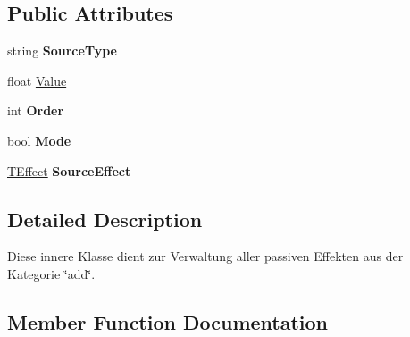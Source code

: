 \subsection*{Public Attributes}
\begin{DoxyCompactItemize}
\item 
\hypertarget{class_r_p_g_object_1_1_attribut_modification_helper_1_1_modification_a209f4406dff4c1139b883f437c838c97}{}string {\bfseries Source\+Type}\label{class_r_p_g_object_1_1_attribut_modification_helper_1_1_modification_a209f4406dff4c1139b883f437c838c97}

\item 
float \hyperlink{class_r_p_g_object_1_1_attribut_modification_helper_1_1_modification_ac47bbc3b20ca8250893a20e816feecd1}{Value}
\item 
\hypertarget{class_r_p_g_object_1_1_attribut_modification_helper_1_1_modification_a5cab54c13609d00e3a0963aecf29109b}{}int {\bfseries Order}\label{class_r_p_g_object_1_1_attribut_modification_helper_1_1_modification_a5cab54c13609d00e3a0963aecf29109b}

\item 
\hypertarget{class_r_p_g_object_1_1_attribut_modification_helper_1_1_modification_ad4e4f83e54f7b0fec528d815c2cfc847}{}bool {\bfseries Mode}\label{class_r_p_g_object_1_1_attribut_modification_helper_1_1_modification_ad4e4f83e54f7b0fec528d815c2cfc847}

\item 
\hypertarget{class_r_p_g_object_1_1_attribut_modification_helper_1_1_modification_a096613a99f591c94f53e96bc31c20f73}{}\hyperlink{class_t_effect}{T\+Effect} {\bfseries Source\+Effect}\label{class_r_p_g_object_1_1_attribut_modification_helper_1_1_modification_a096613a99f591c94f53e96bc31c20f73}

\end{DoxyCompactItemize}


\subsection{Detailed Description}
Diese innere Klasse dient zur Verwaltung aller passiven Effekten aus der Kategorie \char`\"{}add\char`\"{}. 

\subsection{Member Function Documentation}
\hypertarget{class_r_p_g_object_1_1_attribut_modification_helper_1_1_modification_af5220719b5d5a37d3d3d3383ad54c5a4}{}

